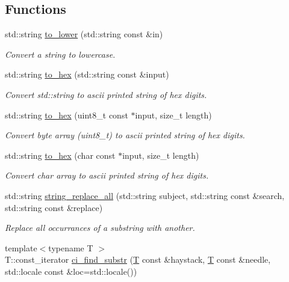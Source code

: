 \subsection*{Functions}
\begin{DoxyCompactItemize}
\item 
std\+::string \mbox{\hyperlink{namespacewebsocketpp_1_1utility_aa96a743a4f0392aac39742c3e5dfd1cc}{to\+\_\+lower}} (std\+::string const \&in)
\begin{DoxyCompactList}\small\item\em Convert a string to lowercase. \end{DoxyCompactList}\item 
std\+::string \mbox{\hyperlink{namespacewebsocketpp_1_1utility_a26e5a26395d95d2f6bf3a9edb8d06dd2}{to\+\_\+hex}} (std\+::string const \&input)
\begin{DoxyCompactList}\small\item\em Convert std\+::string to ascii printed string of hex digits. \end{DoxyCompactList}\item 
std\+::string \mbox{\hyperlink{namespacewebsocketpp_1_1utility_a42132bbbc1632f7ba964bd87ac5f288f}{to\+\_\+hex}} (uint8\+\_\+t const $\ast$input, size\+\_\+t length)
\begin{DoxyCompactList}\small\item\em Convert byte array (uint8\+\_\+t) to ascii printed string of hex digits. \end{DoxyCompactList}\item 
std\+::string \mbox{\hyperlink{namespacewebsocketpp_1_1utility_a9f9ed51337c9b493abc97b639b0fbe2e}{to\+\_\+hex}} (char const $\ast$input, size\+\_\+t length)
\begin{DoxyCompactList}\small\item\em Convert char array to ascii printed string of hex digits. \end{DoxyCompactList}\item 
std\+::string \mbox{\hyperlink{namespacewebsocketpp_1_1utility_a5d36afd6d8da4b22b5d634e035bfb450}{string\+\_\+replace\+\_\+all}} (std\+::string subject, std\+::string const \&search, std\+::string const \&replace)
\begin{DoxyCompactList}\small\item\em Replace all occurrances of a substring with another. \end{DoxyCompactList}\item 
{\footnotesize template$<$typename T $>$ }\\T\+::const\+\_\+iterator \mbox{\hyperlink{namespacewebsocketpp_1_1utility_a484f1287b93cf58cc6514e46eed41568}{ci\+\_\+find\+\_\+substr}} (\mbox{\hyperlink{struct_t}{T}} const \&haystack, \mbox{\hyperlink{struct_t}{T}} const \&needle, std\+::locale const \&loc=std\+::locale())

\end{DoxyCompactItemize}
